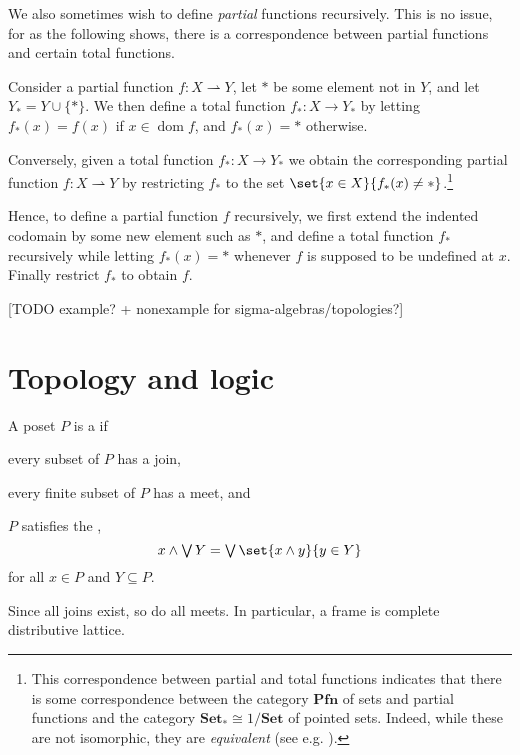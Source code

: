 \documentclass[a4paper, 11pt, article, danish, oneside]{memoir}
\newcommand{\meet}{\land}
\DeclareMathOperator*{\smallbigvee}{\textstyle\bigvee}
\DeclareMathOperator*{\bigjoin}{\mathchoice
    {\smallbigvee}%
    {\bigvee}%
    {\bigvee}%
    {\bigvee}%
}
\newcommand*\union\cup
\newcommand{\pto}{\rightharpoonup}
\newcommand{\dom}{\operatorname{dom}}
\begin{document}
We also sometimes wish to define \emph{partial} functions recursively. This is no issue, for as the following shows, there is a correspondence between partial functions and certain total functions.

\newcommand{\cat}{\mathbf}
\newcommand{\catPfn}{\cat{Pfn}}
\newcommand{\catSet}{\cat{Set}}
\newcommand{\catSetP}{\cat{Set}_*}

\begin{example}
    Consider a partial function $f \colon X \pto Y$, let $*$ be some element not in $Y$, and let $Y_* = Y \union \{*\}$. We then define a total function $f_* \colon X \to Y_*$ by letting $f_*(x) = f(x)$ if $x \in \dom f$, and $f_*(x) = *$ otherwise.

    Conversely, given a total function $f_* \colon X \to Y_*$ we obtain the corresponding partial function $f \colon X \pto Y$ by restricting $f_*$ to the set $\set{x \in X}{f_*(x) \neq *}$.\footnote{This correspondence between partial and total functions indicates that there is some correspondence between the category $\catPfn$ of sets and partial functions and the category $\catSetP \cong 1/\catSet$ of pointed sets. Indeed, while these are not isomorphic, they are \emph{equivalent} (see e.g. \cite[Theorems~156 and 158]{smith-categories-2}).}
\end{example}
%
Hence, to define a partial function $f$ recursively, we first extend the indented codomain by some new element such as $*$, and define a total function $f_*$ recursively while letting $f_*(x) = *$ whenever $f$ is supposed to be undefined at $x$. Finally restrict $f_*$ to obtain $f$.


[TODO example? + nonexample for sigma-algebras/topologies?]


\section{Topology and logic}

\begin{definition}[Frames]
    A poset $P$ is a  if
    \begin{enumdef}
        \item every subset of $P$ has a join,
        \item every finite subset of $P$ has a meet, and
        \item $P$ satisfies the ,
        \begin{equation*}
            x \meet \bigjoin Y
                = \bigjoin \set{x \meet y}{y \in Y}
        \end{equation*}
        for all $x \in P$ and $Y \subseteq P$.
    \end{enumdef}
\end{definition}
%
Since all joins exist, so do all meets. In particular, a frame is complete distributive lattice.
\end{document}
